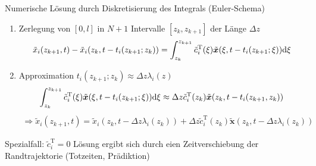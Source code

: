 Numerische Lösung durch Diskretisierung des Integrals (Euler-Schema)
\begin{enumerate}
\item Zerlegung von $[0, l]$ in $N+1$ Intervalle $[z_k,z_{k+1}]$ der Länge $\Delta z$ \[\tilde{x}_i(z_{k+1},t)-\tilde{x}_i(z_{k},t-t_i(z_{k+1};z_k)) = \int_{z_k}^{z_{k+1}}\tilde{c}_i^{\textrm{T}}(\xi)\tilde{\bm{x}}(\xi,t-t_i(z_{k+1};\xi))\mathrm{d} \xi \]
\item Approximation $t_i(z_{k+1};z_k) \approx \Delta z \lambda_i(z)$ \[ \int_{z_k}^{z_{k+1}}\tilde{c}_i^{\textrm{T}}(\xi)\tilde{\bm{x}}(\xi,t-t_i(z_{k+1};\xi))\mathrm{d} \xi \approx \Delta z \tilde{c}_i^{\textrm{T}}(z_k)\tilde{\bm{x}}(z_k,t-t_i(z_{k+1},z_k)) \]
\begin{align}
\Rightarrow \tilde{x}_i(z_{k+1},t) = \tilde{x}_i(z_k,t-\Delta z \lambda_i(z_k)) + \Delta z \tilde{c}_i^{\textrm{T}}(z_k)\tilde{\bm{x}}(z_k,t-\Delta z \lambda_i(z_k))
\end{align}
\end{enumerate}
Spezialfall: $\tilde{c}_i^{\textrm{T}}=0$ Lösung ergibt sich durch eien Zeitverschiebung der Randtrajektorie (Totzeiten, Prädiktion)
